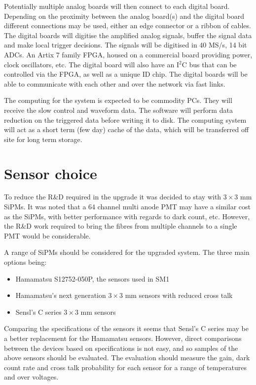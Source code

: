 \documentclass[a4paper]{article}
\begin{document}
Potentially multiple analog boards will then connect to each digital board.
Depending on the proximity between the analog board(s) and the digital board different connections may be used, either an edge connector or a ribbon of cables.
The digital boards will digitise the amplified analog signals, buffer the signal data and make local trigger decisions.
The signals will be digitised in 40 MS/s, 14 bit ADCs.
An Artix 7 family FPGA, housed on a commercial board providing power, clock oscillators, etc.
The digital board will also have an I$^2$C bus that can be controlled via the FPGA, as well as a unique ID chip.
The digital boards will be able to communicate with each other and over the network via fast links.

The computing for the system is expected to be commodity PCs.
They will receive the slow control and waveform data.
The software will perform data reduction on the triggered data before writing it to disk.
The computing system will act as a short term (few day) cache of the data, which will be transferred off site for long term storage.

\section{Sensor choice}

To reduce the R\&D required in the upgrade it was decided to stay with $3\times3$ mm SiPMs.
It was noted that a 64 channel multi anode PMT may have a similar cost as the SiPMs, with better performance with regards to dark count, etc.
However, the R\&D work required to bring the fibres from multiple channels to a single PMT would be considerable.

A range of SiPMs should be considered for the upgraded system.
The three main options being:
\begin{itemize}
    \item Hamamatsu S12752-050P, the sensors used in SM1
    \item Hamamatsu's next generation $3\times3$ mm sensors with reduced cross talk
    \item Sensl's C series $3\times3$ mm sensors
\end{itemize}

Comparing the specifications of the sensors it seems that Sensl's C series may be a better replacement for the Hamamatsu sensors.
However, direct comparisons between the devices based on specifications is not easy, and so samples of the above sensors should be evaluated.
The evaluation should measure the gain, dark count rate and cross talk probability for each sensor for a range of temperatures and over voltages.
\end{document}
